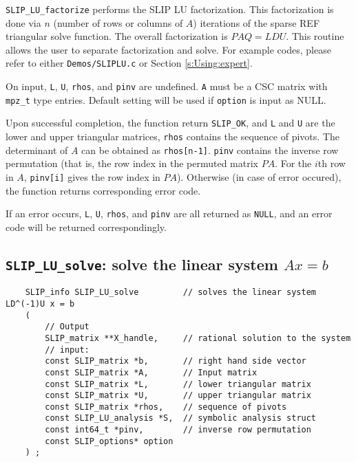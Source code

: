 \documentclass[12pt]{article}
\theoremstyle{definition}
\begin{document}
\verb|SLIP_LU_factorize| performs the SLIP LU factorization. This factorization
is done via $n$ (number of rows or columns of $A$) iterations of the sparse
REF triangular solve function. The overall factorization is $PAQ = LDU$.  This
routine allows the user to separate factorization and solve. For example codes,
please refer to either \verb|Demos/SLIPLU.c| or Section \ref{s:Using:expert}.

On input, \verb|L|, \verb|U|, \verb|rhos|, and \verb|pinv| are undefined. 
\verb|A| must be a CSC matrix with \verb|mpz_t| type entries. Default setting
will be used if \verb|option| is input as NULL.

Upon successful completion, the function return \verb|SLIP_OK|, and
\verb|L| and \verb|U| are the lower and upper triangular matrices,
\verb|rhos| contains the sequence of pivots. The determinant of $A$ can be
obtained as \verb|rhos[n-1]|. \verb|pinv| contains the inverse row permutation
(that is, the row index in the permuted matrix $PA$. For the $i$th row in $A$,
\verb|pinv[i]| gives the row index in $PA$). Otherwise (in case of error
occured), the function returns corresponding error code.


If an error occurs, \verb|L|, \verb|U|, \verb|rhos|, and \verb|pinv| are all
returned as \verb|NULL|, and an error code will be returned correspondingly.

\cprotect\subsection{\verb|SLIP_LU_solve|: solve the linear system $Ax=b$}
\label{ss:SLIP_LU_solve}

\begin{mdframed}[userdefinedwidth=6in]
{\footnotesize
\begin{verbatim}
    SLIP_info SLIP_LU_solve         // solves the linear system LD^(-1)U x = b
    (
        // Output
        SLIP_matrix **X_handle,     // rational solution to the system
        // input:
        const SLIP_matrix *b,       // right hand side vector
        const SLIP_matrix *A,       // Input matrix
        const SLIP_matrix *L,       // lower triangular matrix
        const SLIP_matrix *U,       // upper triangular matrix
        const SLIP_matrix *rhos,    // sequence of pivots
        const SLIP_LU_analysis *S,  // symbolic analysis struct
        const int64_t *pinv,        // inverse row permutation
        const SLIP_options* option
    ) ;
\end{verbatim}
} \end{mdframed}
\end{document}
